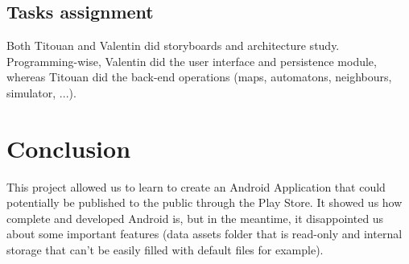 \documentclass{report}
\begin{document}
\section{Tasks assignment}
Both Titouan and Valentin did storyboards and architecture study. Programming-wise, Valentin did the user interface and persistence module, whereas Titouan did the back-end operations (maps, automatons, neighbours, simulator, ...).

\chapter{Conclusion}
This project allowed us to learn to create an Android Application that could potentially be published to the public through the Play Store. It showed us how complete and developed Android is, but in the meantime, it disappointed us about some important features (data assets folder that is read-only and internal storage that can't be easily filled with default files for example).  
\end{document}
